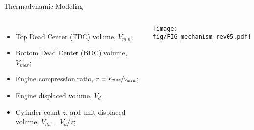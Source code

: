 \begin{frame}{Thermodynamic Modeling}
\begin{columns}
{\begin{itemize}
                    \item Top Dead Center (TDC) volume, \alert{$V_{min}$};
                    \item Bottom Dead Center (BDC) volume, \alert{$V_{max}$};
                    \item Engine compression ratio, \alert{$r=\nicefrac{V_{max}}{V_{min}}$};
                    \item Engine displaced volume, \alert{$V_{d}$};
                    \item Cylinder count \alert{$z$}, and unit displaced volume,
                        \alert{$V_{du}=V_d/z$};
                \end{itemize}
            }

        \vspace*{-4mm}%
        \hspace*{-6mm}\texttt{[image: fig/FIG\_mechanism\_rev05.pdf]}

        \end{columns}
    \end{frame}

